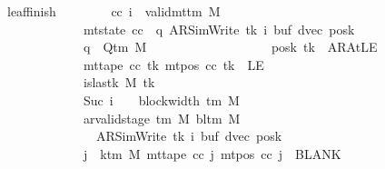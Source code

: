 \begin{isabellebody}
\ \ \ \ \ \ \ leaf{\isacharunderscore}{\kern0pt}finish{\isacharcolon}{\kern0pt}\isanewline
\ \ \ \ \ \ \ \ {\isachardoublequoteopen}{\isasymAnd}cc\ i{\isachardot}{\kern0pt}\ {\isasymlbrakk}\ valid{\isacharunderscore}{\kern0pt}mttm\ M{\isacharsemicolon}{\kern0pt}\isanewline
\ \ \ \ \ \ \ \ \ \ \ \ \ \ \ \ \ \ \ mt{\isacharunderscore}{\kern0pt}state\ cc\ {\isacharequal}{\kern0pt}\ {\isacharparenleft}{\kern0pt}q{\isacharcomma}{\kern0pt}\ AR{\isacharunderscore}{\kern0pt}SimWrite{\isacharcomma}{\kern0pt}\ tk{\isacharcomma}{\kern0pt}\ i{\isacharcomma}{\kern0pt}\ buf{\isacharcomma}{\kern0pt}\ dvec{\isacharcomma}{\kern0pt}\ posk{\isacharparenright}{\kern0pt}{\isacharsemicolon}{\kern0pt}\isanewline
\ \ \ \ \ \ \ \ \ \ \ \ \ \ \ \ \ \ \ q\ {\isasymin}\ Q{\isacharunderscore}{\kern0pt}tm\ M{\isacharsemicolon}{\kern0pt}\isanewline
\ \ \ \ \ \ \ \ \ \ \ \ \ \ \ \ \ \ \ posk\ tk\ {\isasymnoteq}\ AR{\isacharunderscore}{\kern0pt}AtLE{\isacharsemicolon}{\kern0pt}\isanewline
\ \ \ \ \ \ \ \ \ \ \ \ \ \ \ \ \ \ \ mt{\isacharunderscore}{\kern0pt}tape\ cc\ tk\ {\isacharparenleft}{\kern0pt}mt{\isacharunderscore}{\kern0pt}pos\ cc\ tk{\isacharparenright}{\kern0pt}\ {\isasymnoteq}\ LE{}{\isacharsemicolon}{\kern0pt}\isanewline
\ \ \ \ \ \ \ \ \ \ \ \ \ \ \ \ \ \ \ is{\isacharunderscore}{\kern0pt}last{\isacharunderscore}{\kern0pt}k\ M\ tk{\isacharsemicolon}{\kern0pt}\isanewline
\ \ \ \ \ \ \ \ \ \ \ \ \ \ \ \ \ \ \ Suc\ i\ {\isacharequal}{\kern0pt}\ {}\ {\isacharasterisk}{\kern0pt}\ block{\isacharunderscore}{\kern0pt}width\ {\isacharparenleft}{\kern0pt}{\isasymGamma}{\isacharunderscore}{\kern0pt}tm\ M{\isacharparenright}{\kern0pt}{\isacharsemicolon}{\kern0pt}\isanewline
\ \ \ \ \ \ \ \ \ \ \ \ \ \ \ \ \ \ \ ar{\isacharunderscore}{\kern0pt}valid{\isacharunderscore}{\kern0pt}stage\ {\isacharparenleft}{\kern0pt}{\isasymGamma}{\isacharunderscore}{\kern0pt}tm\ M{\isacharparenright}{\kern0pt}\ {\isacharparenleft}{\kern0pt}bl{\isacharunderscore}{\kern0pt}tm\ M{\isacharparenright}{\kern0pt}\isanewline
\ \ \ \ \ \ \ \ \ \ \ \ \ \ \ \ \ \ \ \ \ {\isacharparenleft}{\kern0pt}AR{\isacharunderscore}{\kern0pt}SimWrite{\isacharcomma}{\kern0pt}\ tk{\isacharcomma}{\kern0pt}\ i{\isacharcomma}{\kern0pt}\ buf{\isacharcomma}{\kern0pt}\ dvec{\isacharcomma}{\kern0pt}\ posk{\isacharparenright}{\kern0pt}{\isacharsemicolon}{\kern0pt}\isanewline
\ \ \ \ \ \ \ \ \ \ \ \ \ \ \ \ \ \ \ {\isasymforall}j\ {\isasymge}\ k{\isacharunderscore}{\kern0pt}tm\ M{\isachardot}{\kern0pt}\ mt{\isacharunderscore}{\kern0pt}tape\ cc\ j\ {\isacharparenleft}{\kern0pt}mt{\isacharunderscore}{\kern0pt}pos\ cc\ j{\isacharparenright}{\kern0pt}\ {\isacharequal}{\kern0pt}\ BLANK{}{\isacharsemicolon}{\kern0pt}\isanewline

\end{isabellebody}
